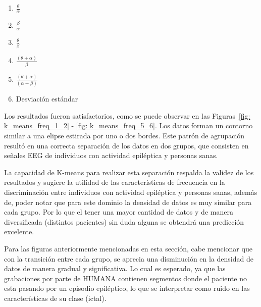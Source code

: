 \begin{enumerate}
    \item $\frac{\theta}{\alpha}$
    \item $\frac{\beta}{\alpha}$
    \item $\frac{\theta}{\beta}$
    \item $\frac{(\theta + \alpha)}{\beta}$
    \item $\frac{(\theta + \alpha)}{(\alpha + \beta)}$
    \item Desviación estándar
\end{enumerate}


Los resultados fueron satisfactorios, como se puede observar en las Figuras~\ref{fig: k_means_freq_1_2} -  \ref{fig: k_means_freq_5_6}. Los datos forman un contorno similar a una elipse estirada por uno o dos bordes. Este patrón de agrupación resultó en una correcta separación de los datos en dos grupos, que consisten en señales EEG de individuos con actividad epiléptica y personas sanas. 

La capacidad de K-means para realizar esta separación respalda la validez de los resultados y sugiere la utilidad de las características de frecuencia en la discriminación entre individuos con actividad epiléptica y personas sanas, además de, poder notar que para este dominio la densidad de datos es muy similar para cada grupo. Por lo que el tener una mayor cantidad de datos y de manera diversificada (distintos pacientes) sin duda alguna se obtendrá una predicción excelente. 

Para las figuras anteriormente mencionadas en esta sección, cabe mencionar que con la transición entre cada grupo, se aprecia una disminución en la densidad de datos de manera gradual y significativa. Lo cual es esperado, ya que las grabaciones por parte de HUMANA contienen segmentos donde el paciente no esta pasando por un episodio epiléptico, lo que se interpretar como ruido en las características de su clase (ictal).



